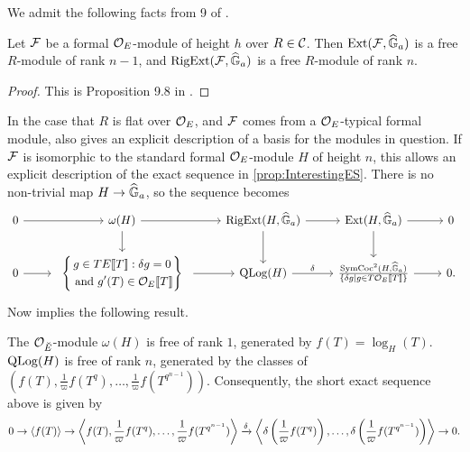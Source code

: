 \documentclass[../main.tex]{subfiles}
\begin{document}
We admit the following facts from  9 of \cite{hopkins1994equivariant}.
\begin{prop}\label{prop:InterestingSequenceStdMod}
  Let $\mathcal{F}$ be a formal ${\mathcal{O}_E}$-module of height $h$ over $R \in \mathcal{C}$. 
  Then $\operatorname{Ext}(\mathcal{F}, \widehat{\mathbb{G}}_a)$ is a free $R$-module of rank $n-1$, 
  and $\operatorname {RigExt}(\mathcal{F}, \widehat{\mathbb{G}}_a)$ is a free $R$-module of rank $n$. 
\begin{proof}
  This is Proposition 9.8 in \cite{hopkins1994equivariant}. \end{proof}
\end{prop}

In the case that $R$ is flat over $\mathcal{O}_E$, and $\mathcal{F}$ comes from a 
$\mathcal{O}_E$-typical formal module, \cite[ 9]{hopkins1994equivariant} also
gives an explicit description of a basis for the modules in question.
If $\mathcal{F}$ is isomorphic to the standard formal $\mathcal{O}_E$-module $H$ of height $n$,
this allows an explicit
description of the exact sequence in \cref{prop:InterestingES}.  
There is no non-trivial map $H \to \widehat{\mathbb{G}}_a$, so the sequence becomes
\begin{equation*}
\begin{tikzcd}[ampersand replacement=\&]
	0 \& {\omega(H)} \& {\RigExt(H,\Ghat_a)} \& {\Ext(H,\Ghat_a)} \& 0 \\
	0 \& \begin{array}{c} \left\{\begin{gathered} {g \in TE\llbr T \rrbr : \delta g = 0} \\          \text{ and $g'(T) \in \cO_E\llbr T \rrbr$}\end{gathered} \right\} \end{array} \& {\QLog(H)} \& {\frac{\SymCoc^2(H, \Ghat_a)}{\{\delta g \mid g \in T \cO_E\llbr T \rrbr\}}} \& 0.
	\arrow[from=1-1, to=1-2]
	\arrow[from=1-2, to=1-3]
	\arrow[from=1-2, to=2-2]
	\arrow[from=1-3, to=1-4]
	\arrow[from=1-3, to=2-3]
	\arrow[from=1-4, to=1-5]
	\arrow[from=1-4, to=2-4]
	\arrow["", from=2-1, to=2-2]
	\arrow[from=2-2, to=2-3]
	\arrow["\delta", from=2-3, to=2-4]
	\arrow[from=2-4, to=2-5]
\end{tikzcd}   
\end{equation*}
Now \cite[Proposition 9.8]{hopkins1994equivariant} implies the following result.
\begin{prop}
  The $\mathcal{O}_{\breve {E}}$-module $\omega(H)$ is free of rank $1$, generated by 
  $f(T) = \log_H(T)$. $\operatorname {QLog}(H)$ is free of rank $n$, generated by the classes of
  $(f(T), \frac 1\varpi f(T^q), \dots, \frac 1\varpi f(T^{q^{n-1}}))$. Consequently,
  the short exact sequence above is given by 
  \begin{equation*}
    0 \to \left \langle f(T) \right \rangle \to \left \langle f(T), \frac 1\varpi
      f(T^q) , \dots,
    \frac 1\varpi f(T^{q^{n-1}}) \right \rangle \xrightarrow{\delta} 
    \left \langle \delta \left(\frac 1\varpi f(T^q)\right),\dots, \delta
    \left(\frac 1\varpi f(T^{q^{n-1}})\right ) \right \rangle \to 0.
  \end{equation*}
\end{prop}
\end{document}

